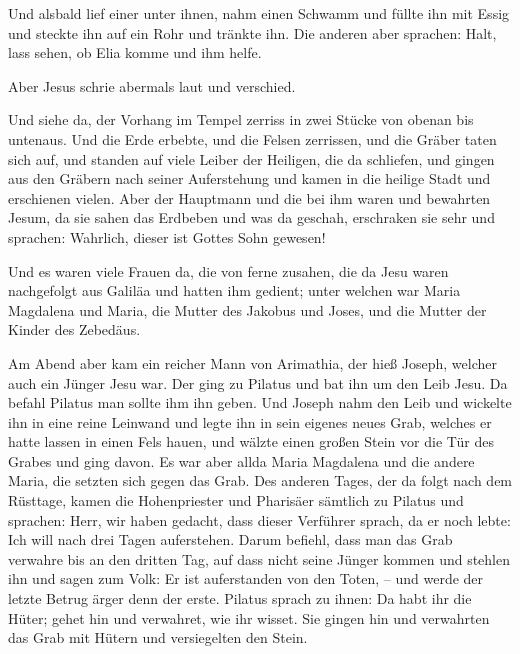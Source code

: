  Und alsbald lief einer unter ihnen, nahm einen Schwamm
und füllte ihn mit Essig und steckte ihn auf ein Rohr und tränkte ihn.
 Die anderen aber sprachen: Halt, lass sehen, ob Elia
komme und ihm helfe.

 Aber Jesus schrie abermals laut und verschied.

 Und siehe da, der Vorhang im Tempel zerriss in zwei
Stücke von obenan bis untenaus.  Und die Erde erbebte,
und die Felsen zerrissen, und die Gräber taten sich auf, und standen auf
viele Leiber der Heiligen, die da schliefen,  und gingen
aus den Gräbern nach seiner Auferstehung und kamen in die heilige Stadt
und erschienen vielen.  Aber der Hauptmann und die bei
ihm waren und bewahrten Jesum, da sie sahen das Erdbeben und was da
geschah, erschraken sie sehr und sprachen: Wahrlich, dieser ist Gottes
Sohn gewesen!

 Und es waren viele Frauen da, die von ferne zusahen, die
da Jesu waren nachgefolgt aus Galiläa und hatten ihm gedient;
 unter welchen war Maria Magdalena und Maria, die Mutter
des Jakobus und Joses, und die Mutter der Kinder des Zebedäus.

 Am Abend aber kam ein reicher Mann von Arimathia, der
hieß Joseph, welcher auch ein Jünger Jesu war.  Der ging
zu Pilatus und bat ihn um den Leib Jesu. Da befahl Pilatus man sollte
ihm ihn geben.  Und Joseph nahm den Leib und wickelte ihn
in eine reine Leinwand  und legte ihn in sein eigenes
neues Grab, welches er hatte lassen in einen Fels hauen, und wälzte
einen großen Stein vor die Tür des Grabes und ging davon.
 Es war aber allda Maria Magdalena und die andere Maria,
die setzten sich gegen das Grab.  Des anderen Tages, der
da folgt nach dem Rüsttage, kamen die Hohenpriester und Pharisäer
sämtlich zu Pilatus  und sprachen: Herr, wir haben
gedacht, dass dieser Verführer sprach, da er noch lebte: Ich will nach
drei Tagen auferstehen.  Darum befiehl, dass man das Grab
verwahre bis an den dritten Tag, auf dass nicht seine Jünger kommen und
stehlen ihn und sagen zum Volk: Er ist auferstanden von den Toten, --
und werde der letzte Betrug ärger denn der erste. 
Pilatus sprach zu ihnen: Da habt ihr die Hüter; gehet hin und verwahret,
wie ihr wisset.  Sie gingen hin und verwahrten das Grab
mit Hütern und versiegelten den Stein.

